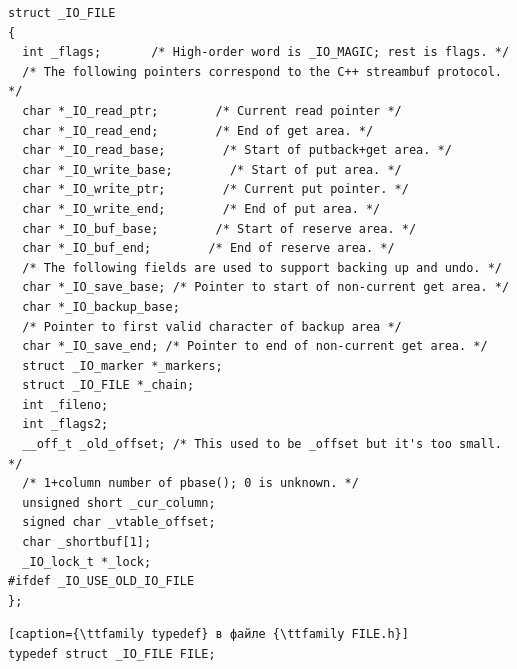 \begin{lstlisting}[caption=Структура {\ttfamily \_IO\_FILE}]
struct _IO_FILE
{
  int _flags;       /* High-order word is _IO_MAGIC; rest is flags. */
  /* The following pointers correspond to the C++ streambuf protocol. */
  char *_IO_read_ptr;        /* Current read pointer */
  char *_IO_read_end;        /* End of get area. */
  char *_IO_read_base;        /* Start of putback+get area. */
  char *_IO_write_base;        /* Start of put area. */
  char *_IO_write_ptr;        /* Current put pointer. */
  char *_IO_write_end;        /* End of put area. */
  char *_IO_buf_base;        /* Start of reserve area. */
  char *_IO_buf_end;        /* End of reserve area. */
  /* The following fields are used to support backing up and undo. */
  char *_IO_save_base; /* Pointer to start of non-current get area. */
  char *_IO_backup_base;
  /* Pointer to first valid character of backup area */
  char *_IO_save_end; /* Pointer to end of non-current get area. */
  struct _IO_marker *_markers;
  struct _IO_FILE *_chain;
  int _fileno;
  int _flags2;
  __off_t _old_offset; /* This used to be _offset but it's too small.  */
  /* 1+column number of pbase(); 0 is unknown. */
  unsigned short _cur_column;
  signed char _vtable_offset;
  char _shortbuf[1];
  _IO_lock_t *_lock;
#ifdef _IO_USE_OLD_IO_FILE
};
\end{lstlisting}

\begin{lstlisting}[caption={\ttfamily typedef} в файле {\ttfamily FILE.h}]
typedef struct _IO_FILE FILE;
\end{lstlisting}
